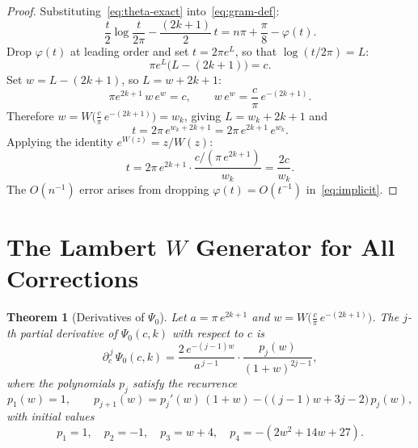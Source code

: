 \documentclass[11pt]{article}
\newtheorem{theorem}{Theorem}[section]
\theoremstyle{definition}
\begin{document}
\begin{proof}
Substituting~\eqref{eq:theta-exact} into~\eqref{eq:gram-def}:
\begin{equation}
  \frac{t}{2}\log\frac{t}{2\pi} - \frac{(2k+1)}{2}\,t
    = n\pi + \frac{\pi}{8} - \varphi(t).
  \label{eq:implicit}
\end{equation}
Drop $\varphi(t)$ at leading order and set $t = 2\pi e^L$, so that
$\log(t/2\pi) = L$:
\begin{equation}
  \pi e^L\bigl(L - (2k+1)\bigr) = c.
  \label{eq:leading-eq}
\end{equation}
Set $w = L - (2k+1)$, so $L = w + 2k+1$:
\begin{equation}
  \pi e^{2k+1}\,w\,e^w = c,
  \qquad
  w\,e^w = \frac{c}{\pi}\,e^{-(2k+1)}.
\end{equation}
Therefore $w = W\!\bigl(\frac{c}{\pi}\,e^{-(2k+1)}\bigr) = w_k$, giving
$L = w_k + 2k+1$ and
\begin{equation}
  t = 2\pi\,e^{w_k + 2k+1} = 2\pi\,e^{2k+1}\,e^{w_k}.
\end{equation}
Applying the identity $e^{W(z)} = z/W(z)$:
\begin{equation}
  t = 2\pi\,e^{2k+1}\cdot\frac{c/(\pi\,e^{2k+1})}{w_k}
    = \frac{2c}{w_k}.
\end{equation}
The $O(n^{-1})$ error arises from dropping $\varphi(t) = O(t^{-1})$
in~\eqref{eq:implicit}.
\end{proof}

\section{The Lambert $W$ Generator for All Corrections}

\begin{theorem}[Derivatives of $\Psi_0$]
\label{thm:derivatives}
Let $a = \pi\,e^{2k+1}$ and $w = W\!\bigl(\frac{c}{\pi}\,e^{-(2k+1)}\bigr)$.
The $j$-th partial derivative of $\Psi_0(c,k)$ with respect to $c$ is
\begin{equation}
  \partial_c^{\,j}\,\Psi_0(c,k)
    = \frac{2\,e^{-(j-1)w}}{a^{\,j-1}}
      \cdot\frac{p_j(w)}{(1+w)^{2j-1}},
  \label{eq:Psi-deriv}
\end{equation}
where the polynomials $p_j$ satisfy the recurrence
\begin{equation}
  p_1(w) = 1,
  \qquad
  p_{j+1}(w) = p_j'(w)\,(1+w) - \bigl((j-1)w + 3j - 2\bigr)\,p_j(w),
  \label{eq:pj-recurrence}
\end{equation}
with initial values
\begin{equation}
  p_1 = 1,\quad
  p_2 = -1,\quad
  p_3 = w + 4,\quad
  p_4 = -(2w^2 + 14w + 27).
\end{equation}
\end{theorem}
\end{document}

